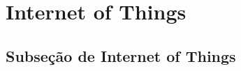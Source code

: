 \section{Internet of Things}
\label{sec:iot}

\subsection{Subseção de Internet of Things}
\label{subsec:iot}